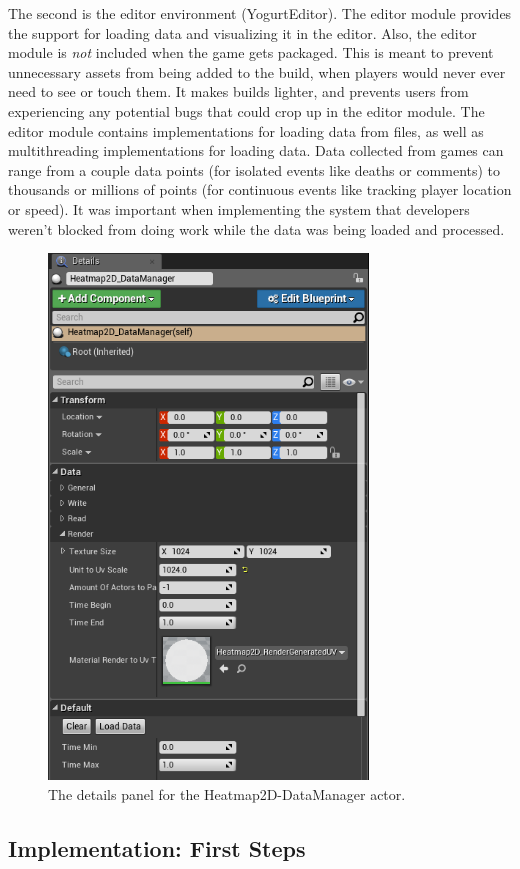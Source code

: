 \documentclass[journal]{IEEEtran}
\begin{document}
The second is the editor environment (YogurtEditor). The editor module provides the support for loading data and visualizing it in the editor. Also, the editor module is \emph{not} included when the game gets packaged. This is meant to prevent unnecessary assets from being added to the build, when players would never ever need to see or touch them. It makes builds lighter, and prevents users from experiencing any potential bugs that could crop up in the editor module. The editor module contains implementations for loading data from files, as well as multithreading implementations for loading data. Data collected from games can range from a couple data points (for isolated events like deaths or comments) to thousands or millions of points (for continuous events like tracking player location or speed). It was important when implementing the system that developers weren't blocked from doing work while the data was being loaded and processed.

\begin{figure}[ht]
\includegraphics[width=8.5cm]{"scene_manager_details"}
\caption{The details panel for the Heatmap2D-DataManager actor.}
\label{sceneManagerDetails}
\end{figure}

\subsection{Implementation: First Steps}
\end{document}

